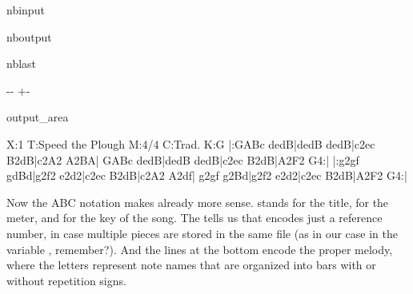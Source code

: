 \documentclass[letterpaper,10pt,english]{sphinxmanual}
\newlength\nbsphinxcodecellspacing
\begin{document}
\begin{sphinxuseclass}{nbinput}
{
\begin{sphinxVerbatim}[commandchars=\\\{\}]
\llap{\color{nbsphinxin}[10]:\,\hspace{\fboxrule}\hspace{\fboxsep}}
\end{sphinxVerbatim}
}

\end{sphinxuseclass}
\begin{sphinxuseclass}{nboutput}
\begin{sphinxuseclass}{nblast}
{

\kern-\sphinxverbatimsmallskipamount\kern-\baselineskip
\kern+\FrameHeightAdjust\kern-\fboxrule
\vspace{\nbsphinxcodecellspacing}

\begin{sphinxuseclass}{output_area}
\begin{sphinxuseclass}{}


\begin{sphinxVerbatim}[commandchars=\\\{\}]

X:1
T:Speed the Plough
M:4/4
C:Trad.
K:G
|:GABc dedB|dedB dedB|c2ec B2dB|c2A2 A2BA|
  GABc dedB|dedB dedB|c2ec B2dB|A2F2 G4:|
|:g2gf gdBd|g2f2 e2d2|c2ec B2dB|c2A2 A2df|
  g2gf g2Bd|g2f2 e2d2|c2ec B2dB|A2F2 G4:|

\end{sphinxVerbatim}



\end{sphinxuseclass}
\end{sphinxuseclass}
}

\end{sphinxuseclass}
\end{sphinxuseclass}
\sphinxAtStartPar
Now the ABC notation makes already more sense.  stands for the title,  for the meter, and  for the key of the song. The  tells us that  encodes just a reference number, in case multiple pieces are stored in the same file (as in our case in the variable , remember?). And the lines at the bottom encode the proper melody, where the letters represent
note names that are organized into bars with or without repetition signs.
\end{document}
